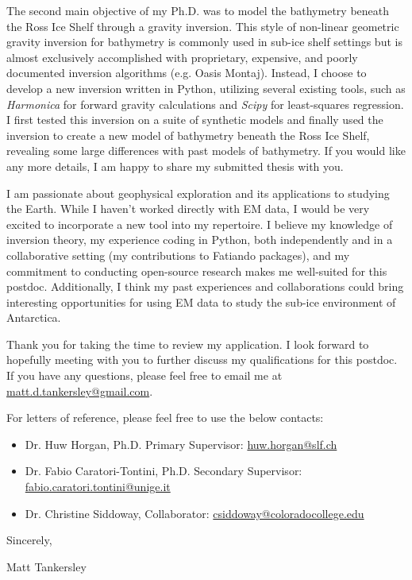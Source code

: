 \documentclass{ExpressiveCoverLetter}
\begin{document}
The second main objective of my Ph.D. was to model the bathymetry
beneath the Ross Ice Shelf through a gravity inversion. This style
of non-linear geometric gravity inversion for bathymetry is commonly
used in sub-ice shelf settings but is almost exclusively accomplished with
proprietary, expensive, and poorly documented inversion algorithms (e.g.
Oasis Montaj). Instead, I choose to develop a new inversion written in Python, utilizing several existing
tools, such as \textit{Harmonica} for forward gravity calculations and
\textit{Scipy} for least-squares regression.
I first tested this inversion on a suite of synthetic models and finally
used the inversion to create a new model of bathymetry beneath the Ross
Ice Shelf, revealing some large differences with past models of
bathymetry.
If you would like any more details, I am happy to share my submitted
thesis with you.

I am passionate about geophysical exploration and its applications to
studying the Earth. While I haven't worked directly with EM data, I
would be very excited to incorporate a new tool into my repertoire. I
believe my knowledge of inversion theory, my experience coding in
Python, both independently and in a collaborative setting (my
contributions to Fatiando packages), and my commitment to conducting open-source
research makes me well-suited for this postdoc. Additionally, I think my
past experiences and collaborations could bring interesting
opportunities for using EM data to study the sub-ice environment of Antarctica.


Thank you for taking the time to review my application. I look forward
to hopefully meeting with you to further discuss my
qualifications for this postdoc. If you have any questions, please feel free to
email me at \href{mailto:matt.d.tankersley@gmail.com}{matt.d.tankersley@gmail.com}.


For letters of reference, please feel free to use the below contacts:
\begin{itemize}
    \item Dr. Huw Horgan, Ph.D. Primary Supervisor: \href{mailto:huw.horgan@slf.ch}{huw.horgan@slf.ch}
    \item Dr. Fabio Caratori-Tontini, Ph.D. Secondary Supervisor: \href{mailto:fabio.caratori.tontini@unige.it}{fabio.caratori.tontini@unige.it}
    \item Dr. Christine Siddoway, Collaborator: \href{mailto:csiddoway@coloradocollege.edu}{csiddoway@coloradocollege.edu}
\end{itemize}


Sincerely,

\vspace{.15in}

Matt Tankersley
\end{document}
